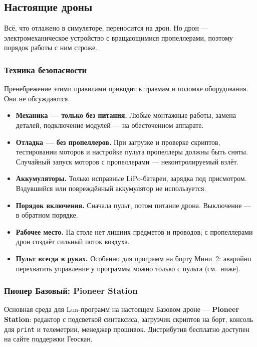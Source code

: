 \subsection{Настоящие дроны}
\label{sec:real-drone}

Всё, что отлажено в симуляторе, переносится на дрон. Но дрон --- электромеханическое устройство с вращающимися пропеллерами, поэтому порядок работы с ним строже.

\subsubsection{Техника безопасности}

\begin{warnbox}
Пренебрежение этими правилами приводит к травмам и поломке оборудования. Они не обсуждаются.
\end{warnbox}

\begin{itemize}
    \item \textbf{Механика --- только без питания.} Любые монтажные работы, замена деталей, подключение модулей --- на обесточенном аппарате.
    \item \textbf{Отладка --- без пропеллеров.} При загрузке и проверке скриптов, тестировании моторов и настройке пульта пропеллеры должны быть сняты. Случайный запуск моторов с пропеллерами --- неконтролируемый взлёт.
    \item \textbf{Аккумуляторы.} Только исправные LiPo-батареи, зарядка под присмотром. Вздувшийся или повреждённый аккумулятор не используется.
    \item \textbf{Порядок включения.} Сначала пульт, потом питание дрона. Выключение --- в обратном порядке.
    \item \textbf{Рабочее место.} На столе нет лишних предметов и проводов; с пропеллерами дрон создаёт сильный поток воздуха.
    \item \textbf{Пульт всегда в руках.} Особенно для программ на борту Мини~2: аварийно перехватить управление у программы можно только с пульта (см.\ ниже).
\end{itemize}

\subsubsection{Пионер Базовый: Pioneer Station}

Основная среда для Lua-программ на настоящем Базовом дроне --- \textbf{Pioneer Station}: редактор с подсветкой синтаксиса, загрузчик скриптов на борт, консоль для \texttt{print} и телеметрии, менеджер прошивок. Дистрибутив бесплатно доступен на сайте поддержки Геоскан.

